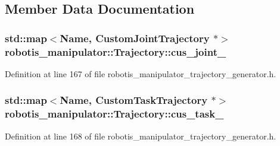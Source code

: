 \subsection{Member Data Documentation}
\subsubsection[{\texorpdfstring{cus\+\_\+joint\+\_\+}{cus_joint_}}]{\setlength{\rightskip}{0pt plus 5cm}std\+::map$<${\bf Name}, {\bf Custom\+Joint\+Trajectory} $\ast$$>$ robotis\+\_\+manipulator\+::\+Trajectory\+::cus\+\_\+joint\+\_\+\hspace{0.3cm}{\ttfamily [private]}}\hypertarget{classrobotis__manipulator_1_1_trajectory_a4424c07ba6cdfb08ca84fff0e2284f67}{}\label{classrobotis__manipulator_1_1_trajectory_a4424c07ba6cdfb08ca84fff0e2284f67}


Definition at line 167 of file robotis\+\_\+manipulator\+\_\+trajectory\+\_\+generator.\+h.

\subsubsection[{\texorpdfstring{cus\+\_\+task\+\_\+}{cus_task_}}]{\setlength{\rightskip}{0pt plus 5cm}std\+::map$<${\bf Name}, {\bf Custom\+Task\+Trajectory} $\ast$$>$ robotis\+\_\+manipulator\+::\+Trajectory\+::cus\+\_\+task\+\_\+\hspace{0.3cm}{\ttfamily [private]}}\hypertarget{classrobotis__manipulator_1_1_trajectory_a1b02b691bf591629f4abf8478c437216}{}\label{classrobotis__manipulator_1_1_trajectory_a1b02b691bf591629f4abf8478c437216}


Definition at line 168 of file robotis\+\_\+manipulator\+\_\+trajectory\+\_\+generator.\+h.

